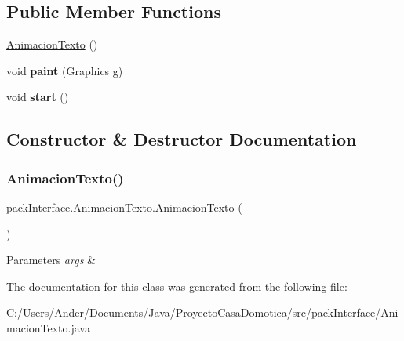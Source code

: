 \subsection*{Public Member Functions}
\begin{DoxyCompactItemize}
\item 
\mbox{\hyperlink{classpack_interface_1_1_animacion_texto_ab74997ca3cbe6518ac17daed9dcd2b77}{Animacion\+Texto}} ()
\item 
\mbox{\label{classpack_interface_1_1_animacion_texto_ae9c7a461fb1291082b1b6fd9674a4849}} 
void {\bfseries paint} (Graphics g)
\item 
\mbox{\label{classpack_interface_1_1_animacion_texto_a3ebfa5522b2f4337870f8cda791d9c21}} 
void {\bfseries start} ()
\end{DoxyCompactItemize}


\subsection{Constructor \& Destructor Documentation}
\mbox{\label{classpack_interface_1_1_animacion_texto_ab74997ca3cbe6518ac17daed9dcd2b77}} 
\subsubsection{\texorpdfstring{Animacion\+Texto()}{AnimacionTexto()}}
{\footnotesize\ttfamily pack\+Interface.\+Animacion\+Texto.\+Animacion\+Texto (\begin{DoxyParamCaption}{ }\end{DoxyParamCaption})}


\begin{DoxyParams}{Parameters}
{\em args} & \\
\hline
\end{DoxyParams}


The documentation for this class was generated from the following file\+:\begin{DoxyCompactItemize}
\item 
C\+:/\+Users/\+Ander/\+Documents/\+Java/\+Proyecto\+Casa\+Domotica/src/pack\+Interface/Animacion\+Texto.\+java\end{DoxyCompactItemize}

